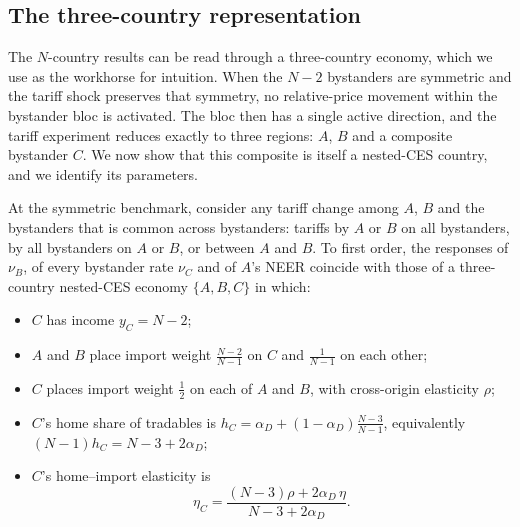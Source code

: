 \subsection{The three-country representation}
\label{sec:composite}

The $N$-country results can be read through a three-country economy, which we use as the workhorse for intuition. When the $N-2$ bystanders are symmetric and the tariff shock preserves that symmetry, no relative-price movement within the bystander bloc is activated. The bloc then has a single active direction, and the tariff experiment reduces exactly to three regions: $A$, $B$ and a composite bystander $C$. We now show that this composite is itself a nested-CES country, and we identify its parameters.

\begin{proposition}
\label{prop:composite}
At the symmetric benchmark, consider any tariff change among $A$, $B$ and the bystanders that is common across bystanders: tariffs by $A$ or $B$ on all bystanders, by all bystanders on $A$ or $B$, or between $A$ and $B$. To first order, the responses of $\nu_B$, of every bystander rate $\nu_C$ and of $A$'s NEER coincide with those of a three-country nested-CES economy $\{A,B,C\}$ in which:
\begin{itemize}
\item $C$ has income $y_C=N-2$;
\item $A$ and $B$ place import weight $\frac{N-2}{N-1}$ on $C$ and $\frac{1}{N-1}$ on each other;
\item $C$ places import weight $\tfrac12$ on each of $A$ and $B$, with cross-origin elasticity $\rho$;
\item $C$'s home share of tradables is $h_C=\alpha_D+(1-\alpha_D)\frac{N-3}{N-1}$, equivalently $(N-1)h_C=N-3+2\alpha_D$;
\item $C$'s home--import elasticity is
\begin{equation}
\boxed{\;\eta_C=\frac{(N-3)\rho+2\alpha_D\,\eta}{N-3+2\alpha_D}.\;}
\label{eq:etaC}
\end{equation}
\end{itemize}
\end{proposition}

